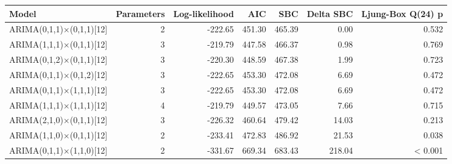 
\begin{tabular}[t]{lrrrrrr}
\toprule
Model & Parameters & Log-likelihood & AIC & SBC & Delta SBC & Ljung-Box Q(24) p\\
\midrule
ARIMA(0,1,1)×(0,1,1)[12] & 2 & -222.65 & 451.30 & 465.39 & 0.00 & 0.532\\
ARIMA(1,1,1)×(0,1,1)[12] & 3 & -219.79 & 447.58 & 466.37 & 0.98 & 0.769\\
ARIMA(0,1,2)×(0,1,1)[12] & 3 & -220.30 & 448.59 & 467.38 & 1.99 & 0.723\\
ARIMA(0,1,1)×(0,1,2)[12] & 3 & -222.65 & 453.30 & 472.08 & 6.69 & 0.472\\
ARIMA(0,1,1)×(1,1,1)[12] & 3 & -222.65 & 453.30 & 472.08 & 6.69 & 0.472\\
ARIMA(1,1,1)×(1,1,1)[12] & 4 & -219.79 & 449.57 & 473.05 & 7.66 & 0.715\\
ARIMA(2,1,0)×(0,1,1)[12] & 3 & -226.32 & 460.64 & 479.42 & 14.03 & 0.213\\
ARIMA(1,1,0)×(0,1,1)[12] & 2 & -233.41 & 472.83 & 486.92 & 21.53 & 0.038\\
ARIMA(0,1,1)×(1,1,0)[12] & 2 & -331.67 & 669.34 & 683.43 & 218.04 & < 0.001\\
\bottomrule
\end{tabular}
